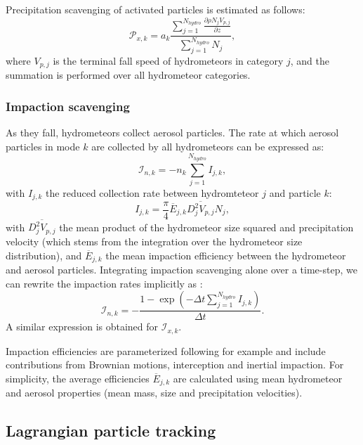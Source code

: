 \documentclass[12pt,A4,french]{article}
\begin{document}
Precipitation scavenging of activated particles is estimated as follows:
\begin{equation}
    \mathcal{P}_{x,k} = a_k \frac {\sum_{j=1}^{N_{hydro}} \frac{\partial \rho N_{j} V_{p,j}}{\partial z}}{\sum_{j=1}^{N_{hydro}} N_j},
\end{equation}
where $V_{p,j}$ is the terminal fall speed of hydrometeors in category $j$, and the summation is performed over all hydrometeor categories. 

\subsubsection{Impaction scavenging}

As they fall, hydrometeors collect aerosol particles. The rate at which aerosol particles in mode $k$ are collected by all hydrometeors  can be expressed as:
\begin{equation}
    \mathcal{I}_{n,k} = - n_k \sum_{j=1}^{N_{hydro}}I_{j,k} ,
\end{equation}
with $I_{j,k}$ the reduced collection rate between hydromteteor $j$ and particle $k$: 
\begin{equation}
    I_{j,k} =  \frac{\pi}{4}\overline{E}_{j,k} \overline{D_j^2 V_{p,j}} N_j,
\end{equation}
with $\overline{D_j^2 V_{p,j}}$ the mean product of the hydrometeor size squared and precipitation velocity (which stems from the integration over the hydrometeor size distribution), and $\overline{E}_{j,k}$ the mean impaction efficiency between the hydrometeor and aerosol particles. Integrating impaction scavenging alone over a time-step, we can rewrite the impaction rates implicitly as \cite{Bal2010}:
\begin{equation}
    \mathcal{I}_{n,k} = - \frac{1 - \exp\left(-\Delta t \sum_{j=1}^{N_{hydro}}I_{j,k}\right)}{\Delta t}.
\end{equation}
A similar expression is obtained for $\mathcal{I}_{x,k}$. 

Impaction efficiencies are parameterized following for example \cite{Bal2010} and include contributions from Brownian motions, interception and inertial impaction. For simplicity, the average efficiencies $\overline{E}_{j,k}$ are calculated using mean hydrometeor and aerosol properties (mean mass, size and precipitation velocities).

\subsection{Lagrangian particle tracking}
\end{document}
